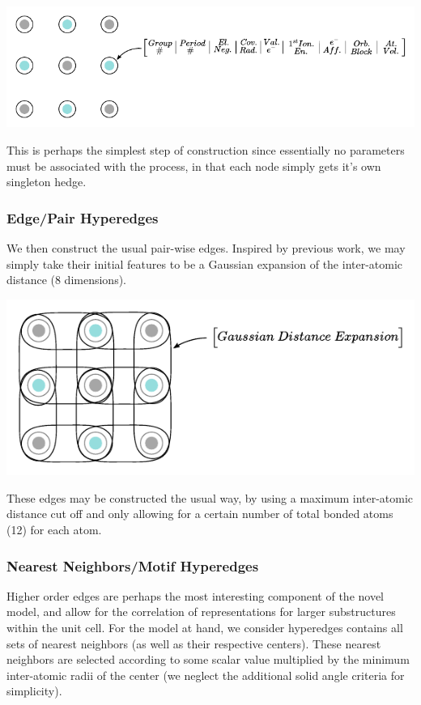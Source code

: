 \documentclass{article}
\begin{document}
\hspace{-.25cm}\includegraphics[scale=0.65]{singleton.pdf}

This is perhaps the simplest step of construction since essentially no parameters must be associated with the process, in that each node simply gets it's own singleton hedge.


\subsubsection{Edge/Pair Hyperedges}
We then construct the usual pair-wise edges.  Inspired by previous work, we may simply take their initial features to be a Gaussian expansion of the inter-atomic distance (8 dimensions).

\includegraphics[scale=0.74]{pair.pdf}

These edges may be constructed the usual way, by using a maximum inter-atomic distance cut off and only allowing for a certain number of total bonded atoms (12) for each atom.


\subsubsection{Nearest Neighbors/Motif Hyperedges}
Higher order edges are perhaps the most interesting component of the novel model, and allow for the correlation of representations for larger substructures within the unit cell. For the model at hand, we consider hyperedges contains all sets of nearest neighbors (as well as their respective centers). These nearest neighbors are selected according to some scalar value multiplied by the minimum inter-atomic radii of the center (we neglect the additional solid angle criteria for simplicity).
\end{document}
